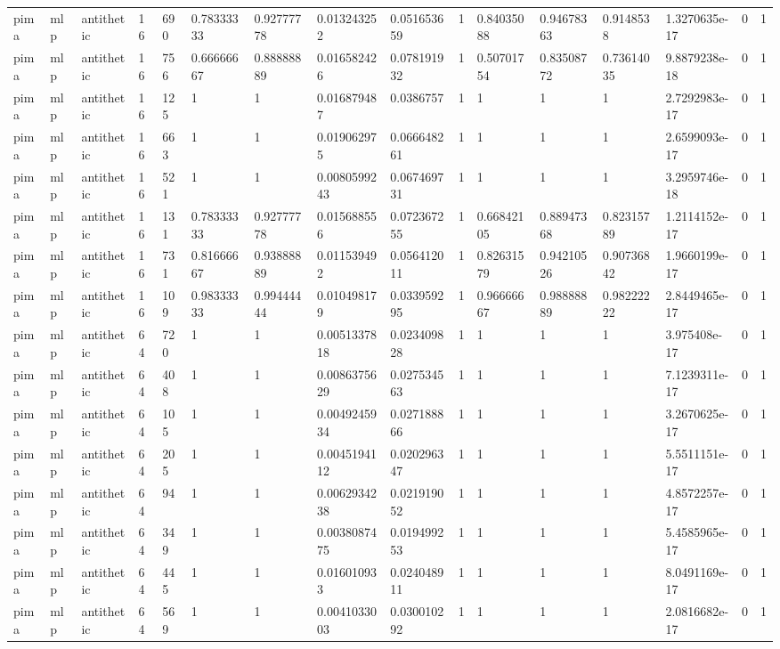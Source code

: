 \begin{tabular}{llllllllllllllll}
pima & mlp & antithetic & 16 & 690 & 0.78333333 & 0.92777778 & 0.013243252 & 0.051653659 & 1 & 0.84035088 & 0.94678363 & 0.9148538 & 1.3270635e-17 & 0 & 1 \\
pima & mlp & antithetic & 16 & 756 & 0.66666667 & 0.88888889 & 0.016582426 & 0.078191932 & 1 & 0.50701754 & 0.83508772 & 0.73614035 & 9.8879238e-18 & 0 & 1 \\
pima & mlp & antithetic & 16 & 125 & 1 & 1 & 0.016879487 & 0.0386757 & 1 & 1 & 1 & 1 & 2.7292983e-17 & 0 & 1 \\
pima & mlp & antithetic & 16 & 663 & 1 & 1 & 0.019062975 & 0.066648261 & 1 & 1 & 1 & 1 & 2.6599093e-17 & 0 & 1 \\
pima & mlp & antithetic & 16 & 521 & 1 & 1 & 0.0080599243 & 0.067469731 & 1 & 1 & 1 & 1 & 3.2959746e-18 & 0 & 1 \\
pima & mlp & antithetic & 16 & 131 & 0.78333333 & 0.92777778 & 0.015688556 & 0.072367255 & 1 & 0.66842105 & 0.88947368 & 0.82315789 & 1.2114152e-17 & 0 & 1 \\
pima & mlp & antithetic & 16 & 731 & 0.81666667 & 0.93888889 & 0.011539492 & 0.056412011 & 1 & 0.82631579 & 0.94210526 & 0.90736842 & 1.9660199e-17 & 0 & 1 \\
pima & mlp & antithetic & 16 & 109 & 0.98333333 & 0.99444444 & 0.010498179 & 0.033959295 & 1 & 0.96666667 & 0.98888889 & 0.98222222 & 2.8449465e-17 & 0 & 1 \\
pima & mlp & antithetic & 64 & 720 & 1 & 1 & 0.0051337818 & 0.023409828 & 1 & 1 & 1 & 1 & 3.975408e-17 & 0 & 1 \\
pima & mlp & antithetic & 64 & 408 & 1 & 1 & 0.0086375629 & 0.027534563 & 1 & 1 & 1 & 1 & 7.1239311e-17 & 0 & 1 \\
pima & mlp & antithetic & 64 & 105 & 1 & 1 & 0.0049245934 & 0.027188866 & 1 & 1 & 1 & 1 & 3.2670625e-17 & 0 & 1 \\
pima & mlp & antithetic & 64 & 205 & 1 & 1 & 0.0045194112 & 0.020296347 & 1 & 1 & 1 & 1 & 5.5511151e-17 & 0 & 1 \\
pima & mlp & antithetic & 64 & 94 & 1 & 1 & 0.0062934238 & 0.021919052 & 1 & 1 & 1 & 1 & 4.8572257e-17 & 0 & 1 \\
pima & mlp & antithetic & 64 & 349 & 1 & 1 & 0.0038087475 & 0.019499253 & 1 & 1 & 1 & 1 & 5.4585965e-17 & 0 & 1 \\
pima & mlp & antithetic & 64 & 445 & 1 & 1 & 0.016010933 & 0.024048911 & 1 & 1 & 1 & 1 & 8.0491169e-17 & 0 & 1 \\
pima & mlp & antithetic & 64 & 569 & 1 & 1 & 0.0041033003 & 0.030010292 & 1 & 1 & 1 & 1 & 2.0816682e-17 & 0 & 1 \\

\end{tabular}
